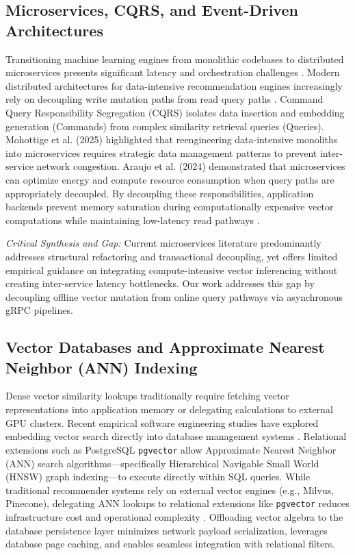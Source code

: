 \documentclass[a4paper,fleqn]{cas-dc}
\begin{document}
\subsection{Microservices, CQRS, and Event-Driven Architectures}
Transitioning machine learning engines from monolithic codebases to distributed microservices presents significant latency and orchestration challenges \cite{mohottige2025}. Modern distributed architectures for data-intensive recommendation engines increasingly rely on decoupling write mutation paths from read query paths \cite{mohottige2025, araujo2024}. Command Query Responsibility Segregation (CQRS) isolates data insertion and embedding generation (Commands) from complex similarity retrieval queries (Queries). Mohottige et al. (2025) \cite{mohottige2025} highlighted that reengineering data-intensive monoliths into microservices requires strategic data management patterns to prevent inter-service network congestion. Araujo et al. (2024) \cite{araujo2024} demonstrated that microservices can optimize energy and compute resource consumption when query paths are appropriately decoupled. By decoupling these responsibilities, application backends prevent memory saturation during computationally expensive vector computations while maintaining low-latency read pathways \cite{alboqmi2025, mohottige2025, araujo2024}.

\medskip\noindent\textit{Critical Synthesis and Gap:} Current microservices literature predominantly addresses structural refactoring and transactional decoupling, yet offers limited empirical guidance on integrating compute-intensive vector inferencing without creating inter-service latency bottlenecks. Our work addresses this gap by decoupling offline vector mutation from online query pathways via asynchronous gRPC pipelines.

\subsection{Vector Databases and Approximate Nearest Neighbor (ANN) Indexing}
Dense vector similarity lookups traditionally require fetching vector representations into application memory or delegating calculations to external GPU clusters. Recent empirical software engineering studies have explored embedding vector search directly into database management systems \cite{ertugrul2025}. Relational extensions such as PostgreSQL \texttt{pgvector} allow Approximate Nearest Neighbor (ANN) search algorithms---specifically Hierarchical Navigable Small World (HNSW) graph indexing---to execute directly within SQL queries. While traditional recommender systems rely on external vector engines (e.g., Milvus, Pinecone), delegating ANN lookups to relational extensions like \texttt{pgvector} reduces infrastructure cost and operational complexity \cite{rebaza2025, huaman2024}. Offloading vector algebra to the database persistence layer minimizes network payload serialization, leverages database page caching, and enables seamless integration with relational filters.
\end{document}
